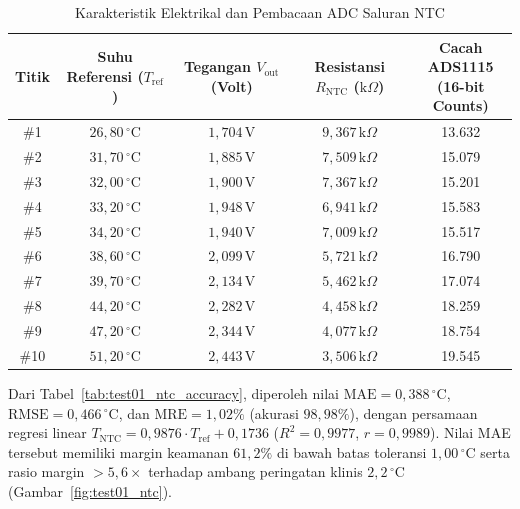 \begin{table}[htbp]
\centering
\caption{Karakteristik Elektrikal dan Pembacaan ADC Saluran NTC}
\label{tab:test01_ntc_electrical}
\small
\setlength{\tabcolsep}{6pt}
\begin{tabular}{|c|c|c|c|c|}
\hline
\textbf{Titik} & \shortstack{\textbf{Suhu Referensi} \\ \textbf{($T_{\mathrm{ref}}$)}} & \shortstack{\textbf{Tegangan $V_{\mathrm{out}}$} \\ \textbf{(Volt)}} & \shortstack{\textbf{Resistansi $R_{\mathrm{NTC}}$} \\ \textbf{($\mathrm{k}\Omega$)}} & \shortstack{\textbf{Cacah ADS1115} \\ \textbf{(16-bit Counts)}} \\ \hline
\#1 & $26{,}80\,^\circ\mathrm{C}$ & $1{,}704\,\mathrm{V}$ & $9{,}367\,\mathrm{k}\Omega$ & 13.632 \\ \hline
\#2 & $31{,}70\,^\circ\mathrm{C}$ & $1{,}885\,\mathrm{V}$ & $7{,}509\,\mathrm{k}\Omega$ & 15.079 \\ \hline
\#3 & $32{,}00\,^\circ\mathrm{C}$ & $1{,}900\,\mathrm{V}$ & $7{,}367\,\mathrm{k}\Omega$ & 15.201 \\ \hline
\#4 & $33{,}20\,^\circ\mathrm{C}$ & $1{,}948\,\mathrm{V}$ & $6{,}941\,\mathrm{k}\Omega$ & 15.583 \\ \hline
\#5 & $34{,}20\,^\circ\mathrm{C}$ & $1{,}940\,\mathrm{V}$ & $7{,}009\,\mathrm{k}\Omega$ & 15.517 \\ \hline
\#6 & $38{,}60\,^\circ\mathrm{C}$ & $2{,}099\,\mathrm{V}$ & $5{,}721\,\mathrm{k}\Omega$ & 16.790 \\ \hline
\#7 & $39{,}70\,^\circ\mathrm{C}$ & $2{,}134\,\mathrm{V}$ & $5{,}462\,\mathrm{k}\Omega$ & 17.074 \\ \hline
\#8 & $44{,}20\,^\circ\mathrm{C}$ & $2{,}282\,\mathrm{V}$ & $4{,}458\,\mathrm{k}\Omega$ & 18.259 \\ \hline
\#9 & $47{,}20\,^\circ\mathrm{C}$ & $2{,}344\,\mathrm{V}$ & $4{,}077\,\mathrm{k}\Omega$ & 18.754 \\ \hline
\#10 & $51{,}20\,^\circ\mathrm{C}$ & $2{,}443\,\mathrm{V}$ & $3{,}506\,\mathrm{k}\Omega$ & 19.545 \\ \hline
\end{tabular}
\end{table}

Dari Tabel~\ref{tab:test01_ntc_accuracy}, diperoleh nilai $\mathrm{MAE} = 0{,}388\,^\circ\mathrm{C}$, $\mathrm{RMSE} = 0{,}466\,^\circ\mathrm{C}$, dan $\mathrm{MRE} = 1{,}02\%$ (akurasi $98{,}98\%$), dengan persamaan regresi linear $T_{\mathrm{NTC}} = 0{,}9876 \cdot T_{\mathrm{ref}} + 0{,}1736$ ($R^2 = 0{,}9977$, $r = 0{,}9989$). Nilai MAE tersebut memiliki margin keamanan $61{,}2\%$ di bawah batas toleransi $1{,}00\,^\circ\mathrm{C}$ serta rasio margin $> 5{,}6\times$ terhadap ambang peringatan klinis $2{,}2\,^\circ\mathrm{C}$ (Gambar~\ref{fig:test01_ntc}).

